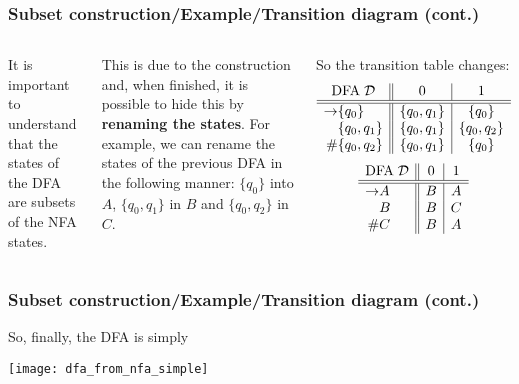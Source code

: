 % 
\begin{frame}
\frametitle{Subset construction/Example/Transition diagram (cont.)}

\begin{columns}

   It is important to understand that the states
  of the DFA are subsets of the NFA states.

  \bigskip

  This is due to the construction and, when finished, it is possible
  to hide this by \textbf{renaming the states}. For example, we can
  rename the states of the previous DFA in the following manner:
  \(\{q_0\}\) into \(A\), \(\{q_0, q_1\}\) in \(B\) and \(\{q_0,
  q_2\}\) in \(C\).

   So the transition table changes:
  \[
  \begin{array}{r@{}l||c|c}
    \multicolumn{2}{c||}{\text{DFA} \; {\cal D}} & 0 & 1\\
    \hline\hline
    \rightarrow & \{q_0\}     & \{q_0, q_1\} & \{q_0\}\\
                & \{q_0,q_1\} & \{q_0,q_1\}  & \{q_0,q_2\}\\
             \# & \{q_0,q_2\} & \{q_0,q_1\}  & \{q_0\}
  \end{array}
  \]
  \[
  \begin{array}{r@{}l||c|c}
    \multicolumn{2}{c||}{\text{DFA} \; {\cal D}} & 0 & 1\\
    \hline\hline
    \rightarrow & A & B & A\\
                & B & B & C\\
             \# & C & B & A
  \end{array}
  \]

\end{columns}

\end{frame}

% 
\begin{frame}
\frametitle{Subset construction/Example/Transition diagram (cont.)}
So, finally, the DFA is simply
\begin{center}
\texttt{[image: dfa\_from\_nfa\_simple]}
\end{center}

\end{frame}

